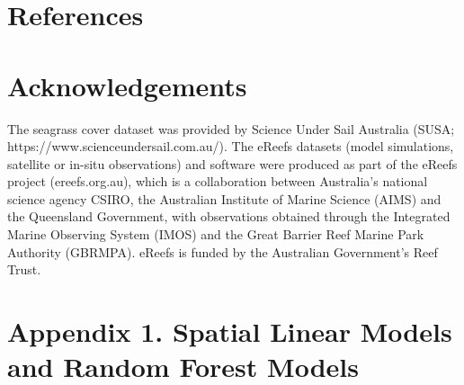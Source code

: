 \documentclass[
  letterpaper,
  DIV=11,
  numbers=noendperiod]{scrartcl}
\begin{document}
\clearpage

\section*{References}\label{references}

\renewcommand{\bibsection}{}


\section{Acknowledgements}\label{acknowledgements}

The seagrass cover dataset was provided by Science Under Sail Australia
(SUSA; https://www.scienceundersail.com.au/). The eReefs datasets (model
simulations, satellite or in-situ observations) and software were
produced as part of the eReefs project (ereefs.org.au), which is a
collaboration between Australia's national science agency CSIRO, the
Australian Institute of Marine Science (AIMS) and the Queensland
Government, with observations obtained through the Integrated Marine
Observing System (IMOS) and the Great Barrier Reef Marine Park Authority
(GBRMPA). eReefs is funded by the Australian Government's Reef Trust.

\clearpage

\section*{Appendix 1. Spatial Linear Models and Random Forest
Models}\label{appendix-1.-spatial-linear-models-and-random-forest-models}
\end{document}
